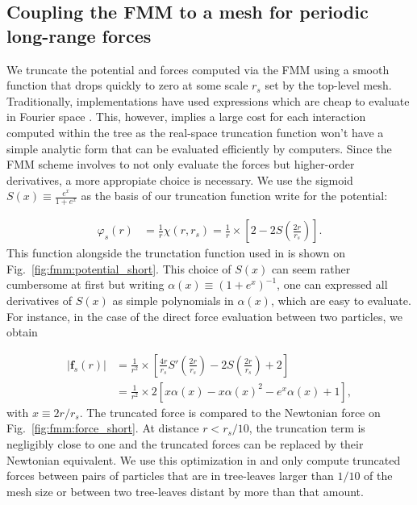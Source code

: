 \subsection{Coupling the FMM to a mesh for periodic long-range forces}
\label{ssec:mesh_summary}

We truncate the potential and forces computed via the FMM using a
smooth function that drops quickly to zero at some scale $r_s$ set by
the top-level mesh. Traditionally, implementations have used
expressions which are cheap to evaluate in Fourier space
\citep[e.g.][]{Bagla2003,
  Springel2005}. This, however, implies a large cost for each
interaction computed within the tree as the real-space truncation
function won't have a simple analytic form that can be evaluated
efficiently by computers. Since the FMM scheme involves to not only
evaluate the forces but higher-order derivatives, a more appropiate
choice is necessary. We use the sigmoid $S(x) \equiv \frac{e^x}{1 + e^x}$
as the basis of our truncation function write for the potential:

\begin{align}
  \varphi_s(r) &= \frac{1}{r} \chi(r, r_s) = \frac{1}{r}\times\left[2 - 2S\left(\frac{2r}{r_s}\right)\right].%
\end{align}
This function alongside the trunctation function used in \gadget is
shown on Fig.~\ref{fig:fmm:potential_short}. This choice of $S(x)$ can
seem rather cumbersome at first but writing $\alpha(x) \equiv (1+e^x)^{-1}$,
one can expressed all derivatives of $S(x)$ as simple polynomials in
$\alpha(x)$, which are easy to evaluate. For instance, in the case of
the direct force evaluation between two particles, we obtain 


\begin{align}
  |\mathbf{f}_s(r)| &=
  \frac{1}{r^2}\times\left[\frac{4r}{r_s}S'\left(\frac{2r}{r_s}\right) -
    2S\left(\frac{2r}{r_s}\right) + 2\right] \nonumber \\
  &=
  \frac{1}{r^2}\times 2 \left[x\alpha(x) - x\alpha(x)^2 - e^x\alpha(x) + 1\right],
\end{align}
with $x\equiv2r/r_s$. The truncated force is compared to the Newtonian
force on Fig.~\ref{fig:fmm:force_short}. At distance $r<r_s/10$, the
truncation term is negligibly close to one and the truncated forces
can be replaced by their Newtonian equivalent. We use this
optimization in \swift and only compute truncated forces between pairs
of particles that are in tree-leaves larger than $1/10$ of the mesh
size or between two tree-leaves distant by more than that amount.

